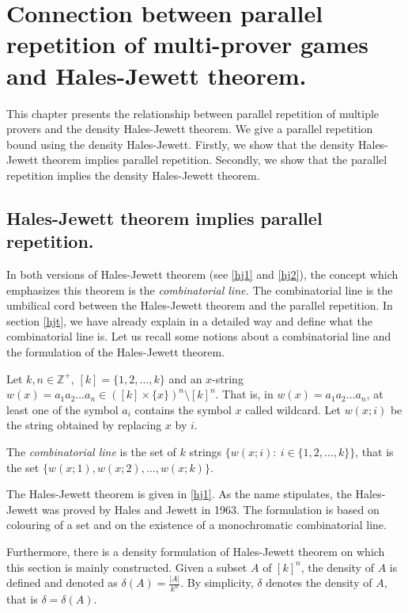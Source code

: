 

\chapter{Connection between parallel repetition of multi-prover games and  Hales-Jewett theorem.}

This chapter presents the relationship between parallel repetition of multiple provers and the density Hales-Jewett theorem. We give a parallel repetition bound using the density Hales-Jewett. Firstly, we show that the density Hales-Jewett theorem implies parallel repetition. Secondly, we show that the parallel repetition implies the density Hales-Jewett theorem.

\section{Hales-Jewett theorem implies parallel repetition.}

In both versions of Hales-Jewett theorem (see \eqref{hj1} and \eqref{hj2}), the concept which emphasizes this theorem is the \textit{combinatorial line.} The combinatorial line is the umbilical cord between the Hales-Jewett theorem and the parallel repetition. In section \eqref{hjt}, we have already explain in a detailed way
and define what the combinatorial line is. Let us recall some notions about a combinatorial line and the formulation of the Hales-Jewett theorem.

Let $k, n\in \mathbb{Z}^+$, $[k]=\{1,2, \ldots,k\}$ and an $x$-string $w(x)=a_1a_2\ldots a_n \in ([k]\times\{x\})^n\setminus [k]^n.$ That is, in $w(x)=a_1a_2\ldots a_n$, at least one of the symbol   $a_i$ contains the symbol  $x$ called wildcard. Let $w(x;i)$ be the string obtained by replacing $x$ by $i$.

The \textit{combinatorial line} is the set of $k$ strings $\{w(x;i): \ i\in \{1,2,\ldots,k\} \}$, that is the set $\{w(x;1), w(x;2), \ldots, w(x;k)\}.$ 
 
The Hales-Jewett theorem is given in \eqref{hj1}.
As the name stipulates, the Hales-Jewett was proved by Hales and Jewett in 1963. The formulation is based on colouring of a set and on the existence of  a monochromatic combinatorial line.

Furthermore, there is a density formulation of Hales-Jewett theorem on which this section is mainly constructed. Given a subset $A$ of $[k]^n$, the density of $A$ is defined and denoted as $\delta(A)=\frac{|A|}{k^n}.$ By simplicity, $\delta$ denotes the density of $A$, that is $\delta=\delta(A).$

